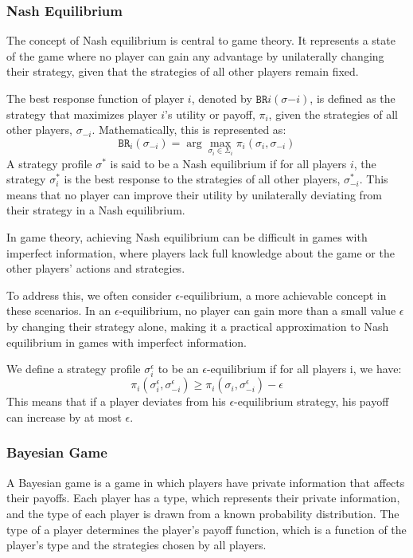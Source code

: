 \documentclass[11pt]{article}
\begin{document}
\subsubsection{Nash Equilibrium}
The concept of Nash equilibrium is central to game theory. It represents a state of the game where no player can gain any advantage by unilaterally changing their strategy, given that the strategies of all other players remain fixed.

The best response function of player $i$, denoted by $\texttt{BR}i(\sigma{-i})$, is defined as the strategy that maximizes player $i$'s utility or payoff, $\pi_i$, given the strategies of all other players, $\sigma_{-i}$. Mathematically, this is represented as:
\begin{equation}
\texttt{BR}_i(\sigma_{-i}) = \arg\max_{\sigma_i \in \Sigma_i} \pi_i(\sigma_i,\sigma_{-i})
\end{equation}
A strategy profile $\sigma^*$ is said to be a Nash equilibrium if for all players $i$, the strategy $\sigma_i^*$ is the best response to the strategies of all other players, $\sigma_{-i}^*$. This means that no player can improve their utility by unilaterally deviating from their strategy in a Nash equilibrium.

In game theory, achieving Nash equilibrium can be difficult in games with imperfect information, where players lack full knowledge about the game or the other players' actions and strategies.

To address this, we often consider $\epsilon$-equilibrium, a more achievable concept in these scenarios. In an $\epsilon$-equilibrium, no player can gain more than a small value $\epsilon$ by changing their strategy alone, making it a practical approximation to Nash equilibrium in games with imperfect information.

We define a strategy profile $\sigma^\epsilon_i$ to be an $\epsilon$-equilibrium if for all players i, we have:
$$
\pi_i(\sigma^\epsilon_i,\sigma^\epsilon_{-i}) \geq \pi_i(\sigma_i, \sigma^\epsilon_{-i}) - \epsilon
$$
This means that if a player deviates from his $\epsilon$-equilibrium strategy, his payoff can increase by at most $\epsilon$.
\subsubsection{Bayesian Game}
A Bayesian game is a game in which players have private information that affects their payoffs. Each player has a type, which represents their private information, and the type of each player is drawn from a known probability distribution. The type of a player determines the player's payoff function, which is a function of the player's type and the strategies chosen by all players.
\end{document}
